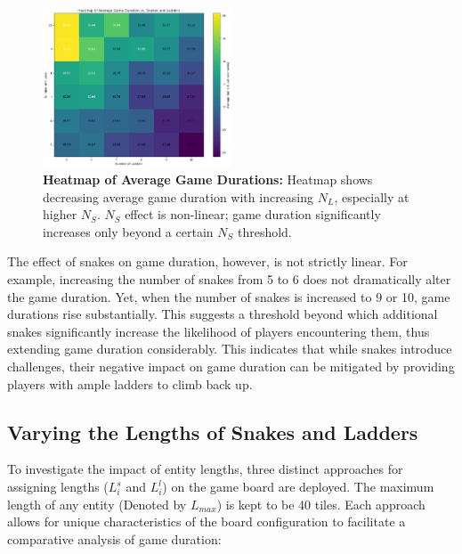 \begin{figure}[th]
	\centering
	\includegraphics[width=0.5\textwidth]{"../Chapter 1/Heatmap"}
	\caption{\textbf{Heatmap of Average Game Durations:} Heatmap shows decreasing average game duration with increasing $N_L$, especially at higher $N_S$. $N_S$ effect is non-linear; game duration significantly increases only beyond a certain $N_S$ threshold.}
	\label{fig:heatmap}
\end{figure}

The effect of snakes on game duration, however, is not strictly linear. For example, increasing the number of snakes from 5 to 6 does not dramatically alter the game duration. Yet, when the number of snakes is increased to 9 or 10, game durations rise substantially. This suggests a threshold beyond which additional snakes significantly increase the likelihood of players encountering them, thus extending game duration considerably. This indicates that while snakes introduce challenges, their negative impact on game duration can be mitigated by providing players with ample ladders to climb back up.


\subsection{Varying the Lengths of Snakes and Ladders}

To investigate the impact of entity lengths, three distinct approaches for assigning lengths ($L^s_i$ and $L^l_i$) on the game board are deployed. The maximum length of any entity (Denoted by $L_{max}$) is kept to be 40 tiles.  Each approach allows for unique characteristics of the board configuration to facilitate a comparative analysis of game duration:

